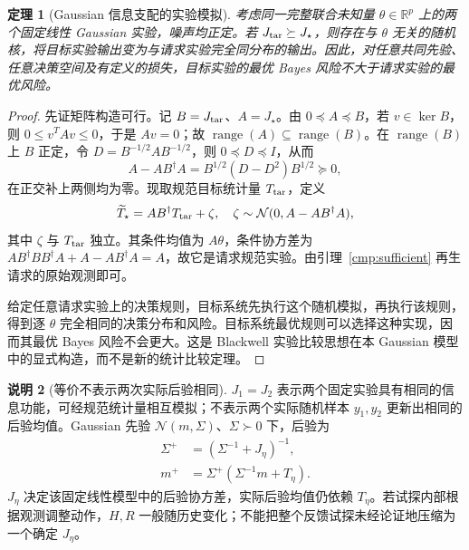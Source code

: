 \documentclass[11pt,a4paper]{article}
\numberwithin{equation}{section}
\newtheorem{theorem}{定理}[section]
\theoremstyle{definition}
\newtheorem{remark}[theorem]{说明}
\newcommand{\R}{\mathbb R}
\begin{document}
\begin{theorem}[Gaussian 信息支配的实验模拟]
\label{cmp:blackwell-gaussian}
考虑同一完整联合未知量 $\theta\in\R^p$ 上的两个固定线性 Gaussian 实验，噪声均正定。若 $J_{\rm tar}\succeq J_\star$，则存在与 $\theta$ 无关的随机核，将目标实验输出变为与请求实验完全同分布的输出。因此，对任意共同先验、任意决策空间及有定义的损失，目标实验的最优 Bayes 风险不大于请求实验的最优风险。
\end{theorem}
\begin{proof}
先证矩阵构造可行。记 $B=J_{\rm tar}$、$A=J_\star$。由 $0\preceq A\preceq B$，若 $v\in\ker B$，则 $0\le v^TAv\le0$，于是 $Av=0$；故 $\operatorname{range}(A)\subseteq\operatorname{range}(B)$。在 $\operatorname{range}(B)$ 上 $B$ 正定，令 $D=B^{-1/2}AB^{-1/2}$，则 $0\preceq D\preceq I$，从而
\begin{equation}
 A-AB^\dagger A=B^{1/2}(D-D^2)B^{1/2}\succeq0,
\end{equation}
在正交补上两侧均为零。现取规范目标统计量 $T_{\rm tar}$，定义
\begin{equation}
 \widetilde T_\star=AB^\dagger T_{\rm tar}+\zeta,
 \quad \zeta\sim\mathcal N(0,A-AB^\dagger A),
 \label{cmp:garbling}
\end{equation}
其中 $\zeta$ 与 $T_{\rm tar}$ 独立。其条件均值为 $A\theta$，条件协方差为
$AB^\dagger BB^\dagger A+A-AB^\dagger A=A$，故它是请求规范实验。由引理~\ref{cmp:sufficient} 再生请求的原始观测即可。

给定任意请求实验上的决策规则，目标系统先执行这个随机模拟，再执行该规则，得到逐 $\theta$ 完全相同的决策分布和风险。目标系统最优规则可以选择这种实现，因而其最优 Bayes 风险不会更大。这是 Blackwell 实验比较思想在本 Gaussian 模型中的显式构造，而不是新的统计比较定理。
\end{proof}

\begin{remark}[等价不表示两次实际后验相同]
\label{cmp:posterior-law}
$J_1=J_2$ 表示两个固定实验具有相同的信息功能，可经规范统计量相互模拟；不表示两个实际随机样本 $y_1,y_2$ 更新出相同的后验均值。Gaussian 先验 $\mathcal N(m,\Sigma)$、$\Sigma\succ0$ 下，后验为
\begin{align}
 \Sigma^+&=(\Sigma^{-1}+J_\eta)^{-1},\\
 m^+&=\Sigma^+(\Sigma^{-1}m+T_\eta).
 \label{cmp:posterior}
\end{align}
$J_\eta$ 决定该固定线性模型中的后验协方差，实际后验均值仍依赖 $T_\eta$。若试探内部根据观测调整动作，$H,R$ 一般随历史变化；不能把整个反馈试探未经论证地压缩为一个确定 $J_\eta$。
\end{remark}
\end{document}
